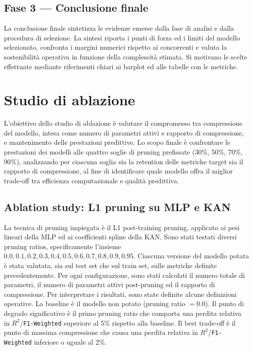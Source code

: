 \documentclass[a4paper,12pt]{report}
\begin{document}
	\subsection{Fase 3 — Conclusione finale}
	La conclusione finale sintetizza le evidenze emerse dalla fase di analisi e dalla procedura di selezione. La sintesi riporta i punti di forza ed i limiti del modello selezionato, confronta i margini numerici rispetto ai concorrenti e valuta la sostenibilità operativa in funzione della complessità stimata. Si motivano le scelte effettuate mediante riferimenti chiari ai barplot ed alle tabelle con le metriche.
	
	\section{Studio di ablazione}
	L'obiettivo dello studio di ablazione è valutare il compromesso tra compressione del modello, intesa come numero di parametri attivi e rapporto di compressione, e mantenimento delle prestazioni predittive. Lo scopo finale è confrontare le prestazioni dei modelli alle quattro soglie di pruning prefissate (30\%, 50\%, 70\%, 90\%), analizzando per ciascuna soglia sia la retention delle metriche target sia il rapporto di compressione, al fine di identificare quale modello offra il miglior trade-off tra efficienza computazionale e qualità predittiva.
	
	\subsection{Ablation study: L1 pruning su MLP e KAN}
	
	La tecnica di pruning impiegata è il L1 post-training pruning, applicato ai pesi lineari della MLP ed ai coefficienti spline della KAN. Sono stati testati diversi pruning ratios, specificamente l'insieme ${0.0,0.1,0.2,0.3,0.4,0.5,0.6,0.7,0.8,0.9,0.95}$. Ciascuna versione del modello potata è stata valutata, sia sul test set che sul train set, sulle metriche definite precedentemente. Per ogni configurazione, sono stati calcolati il numero totale di parametri, il numero di parametri attivi post-pruning ed il rapporto di compressione. Per interpretare i risultati, sono state definite alcune definizioni operative. La baseline è il modello non potato (pruning ratio $= 0.0$). Il punto di degrado significativo è il primo pruning ratio che comporta una perdita relativa in $R^2$/\texttt{F1-Weighted} superiore al 5\% rispetto alla baseline. Il best trade-off è il punto di massima compressione che causa una perdita relativa in $R^2$/\texttt{F1-Weighted} inferiore o uguale al 2\%.
	
\end{document}

